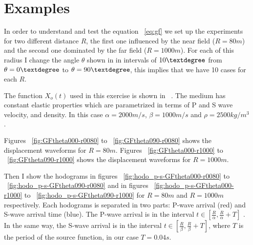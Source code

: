 \section{Examples}


In order to understand and test the equation ~\ref{eq:gf} we set up  the experiments for two different distance $R$, the 
first one influenced by the near field ($R=80m$) and the second one dominated by the far field ($R=1000m$). For each of this
radius I change the angle $\theta$ shown in  in intervals of $10\textdegree$ from $\theta=0\textdegree$ to 
$\theta=90\textdegree$, this implies that we have 10 cases for each $R$.

The function $X_o(t)$ used in this exercise is shown in ~. The medium has constant elastic properties which
are parametrized in terms of P and S wave velocity, and density. In this case $\alpha=2000m/s$, $\beta=1000m/s$ 
and $\rho=2500kg/m^3$.

Figures ~\ref{fig:GFtheta000-r0080} to ~\ref{fig:GFtheta090-r0080} shows the displacement waveforms for $R=80m$.
Figures ~\ref{fig:GFtheta000-r1000} to ~\ref{fig:GFtheta090-r1000} shows the displacement waveforms for $R=1000m$.

Then I show the hodograms in figures ~\ref{fig:hodo_p-s-GFtheta000-r0080} to ~\ref{fig:hodo_p-s-GFtheta090-r0080} and in figures
~\ref{fig:hodo_p-s-GFtheta000-r1000} to ~\ref{fig:hodo_p-s-GFtheta090-r1000}  for $R=80m$ and $R=1000m$ respectively. Each hodograms
is separated in two parts: P-wave arrival (red) and S-wave arrival time (blue). The P-wave arrival is in the interval $t \in [\frac{R}{\alpha},\frac{R}{\alpha}+T]$
. In the same way, the S-wave arrival is in the interval $t \in [\frac{R}{\beta},\frac{R}{\beta}+T]$, where $T$ is the period of the 
source function, in our case $T=0.04s$.




